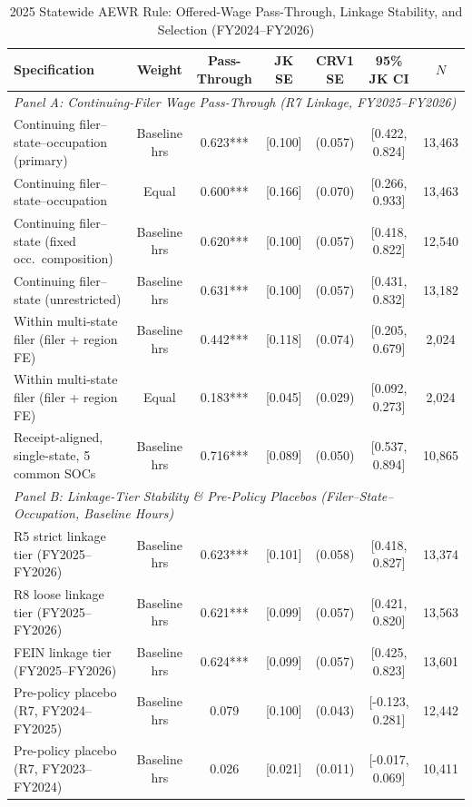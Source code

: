 \begin{table}[!htbp]
\centering
\caption{2025 Statewide AEWR Rule: Offered-Wage Pass-Through, Linkage Stability, and Selection (FY2024--FY2026)}
\label{tab:policy_2025_wages}
\small
\begin{tabular}{lcccccc}
\toprule
Specification & Weight & Pass-Through & JK SE & CRV1 SE & 95\% JK CI & $N$ \\
\midrule
\multicolumn{7}{l}{\textit{Panel A: Continuing-Filer Wage Pass-Through (R7 Linkage, FY2025--FY2026)}} \\
Continuing filer--state--occupation (primary) & Baseline hrs & 0.623*** & [0.100] & (0.057) & [0.422, 0.824] & 13,463 \\
Continuing filer--state--occupation & Equal & 0.600*** & [0.166] & (0.070) & [0.266, 0.933] & 13,463 \\
Continuing filer--state (fixed occ.\ composition) & Baseline hrs & 0.620*** & [0.100] & (0.057) & [0.418, 0.822] & 12,540 \\
Continuing filer--state (unrestricted) & Baseline hrs & 0.631*** & [0.100] & (0.057) & [0.431, 0.832] & 13,182 \\
Within multi-state filer (filer + region FE) & Baseline hrs & 0.442*** & [0.118] & (0.074) & [0.205, 0.679] & 2,024 \\
Within multi-state filer (filer + region FE) & Equal & 0.183*** & [0.045] & (0.029) & [0.092, 0.273] & 2,024 \\
Receipt-aligned, single-state, 5 common SOCs & Baseline hrs & 0.716*** & [0.089] & (0.050) & [0.537, 0.894] & 10,865 \\
\midrule
\multicolumn{7}{l}{\textit{Panel B: Linkage-Tier Stability \& Pre-Policy Placebos (Filer--State--Occupation, Baseline Hours)}} \\
R5 strict linkage tier (FY2025--FY2026) & Baseline hrs & 0.623*** & [0.101] & (0.058) & [0.418, 0.827] & 13,374 \\
R8 loose linkage tier (FY2025--FY2026) & Baseline hrs & 0.621*** & [0.099] & (0.057) & [0.421, 0.820] & 13,563 \\
FEIN linkage tier (FY2025--FY2026) & Baseline hrs & 0.624*** & [0.099] & (0.057) & [0.425, 0.823] & 13,601 \\
Pre-policy placebo (R7, FY2024--FY2025) & Baseline hrs & 0.079 & [0.100] & (0.043) & [-0.123, 0.281] & 12,442 \\
Pre-policy placebo (R7, FY2023--FY2024) & Baseline hrs & 0.026 & [0.021] & (0.011) & [-0.017, 0.069] & 10,411 \\

\end{tabular}
\end{table}
